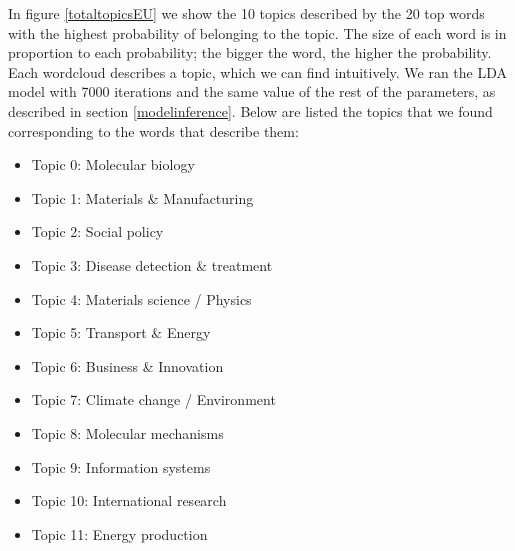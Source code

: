 \documentclass[12pt]{report}
\begin{document}
In figure \ref{totaltopicsEU} we show the 10 topics described by
the 20 top words with the highest probability of belonging
to the topic. The size of each word is in proportion to each
probability; the bigger the word, the higher the probability. Each
wordcloud describes a topic, which we can find intuitively. 
We ran the LDA model with 7000
iterations and the same value of the rest of the
parameters, as described in section \ref{modelinference}. Below are
listed the topics that we found corresponding to the words that
describe them:
\begin{itemize}
\item[] Topic 0: Molecular biology
\item[] Topic 1: Materials \& Manufacturing
\item[] Topic 2: Social policy
\item[] Topic 3: Disease detection \& treatment
\item[] Topic 4: Materials science / Physics
\item[] Topic 5: Transport \& Energy
\item[] Topic 6: Business \& Innovation
\item[] Topic 7: Climate change / Environment
\item[] Topic 8: Molecular mechanisms
\item[] Topic 9: Information systems
\item[] Topic 10: International research
\item[] Topic 11: Energy production
\end{itemize}
\end{document}
